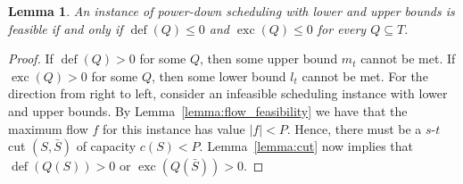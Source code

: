 \documentclass[a4paper]{article}
\DeclareMathOperator{\opdef}{def}
\DeclareMathOperator{\exc}{exc}
\newtheorem{lemma}[theorem]{Lemma}
\begin{document}
\begin{lemma}\label{lemma:feasibility}
  An instance of power-down scheduling with lower and upper bounds is feasible if and only if $\opdef(Q) \leq 0$ and $\exc(Q) \leq 0$ for every $Q \subseteq T$.
\end{lemma}
\begin{proof}
  If $\opdef(Q) > 0$ for some $Q$, then some upper bound $m_t$ cannot be met.
  If $\exc(Q) > 0$ for some $Q$, then some lower bound $l_t$ cannot be met.
  For the direction from right to left, consider an infeasible scheduling instance with lower and upper bounds.
  By Lemma~\ref{lemma:flow_feasibility} we have that the maximum flow $f$ for this instance has value $|f| < P$.
  Hence, there must be a $s$-$t$ cut $(S, \bar S)$ of capacity $c(S) < P$.
  Lemma~\ref{lemma:cut} now implies that $\opdef(Q(S)) > 0$ or $\exc(Q(\bar S)) > 0$.
\end{proof}
\end{document}
